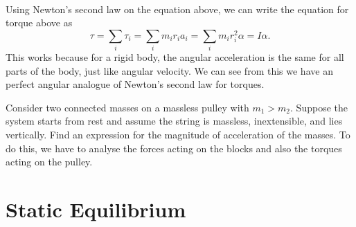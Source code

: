 \documentclass[../classical_mechanics.tex]{subfiles}
\begin{document}
        \paragraph{}
        Using Newton's second law on the equation above, we can write the equation for torque above as
        \begin{equation}
            \tau=\sum_i\tau_i=\sum_im_ir_ia_i=\sum_im_ir_i^2\alpha=I\alpha.
        \end{equation}
        This works because for a rigid body, the angular acceleration is the same for all parts of the body, just like angular velocity.
        We can see from this we have an perfect angular analogue of Newton's second law for torques.
        \begin{example}
            Consider two connected masses on a massless pulley with $m_1>m_2$.
            Suppose the system starts from rest and assume the string is massless, inextensible, and lies vertically.
            Find an expression for the magnitude of acceleration of the masses.
            To do this, we have to analyse the forces acting on the blocks and also the torques acting on the pulley.
        \end{example}

    \section{Static Equilibrium}
\end{document}
